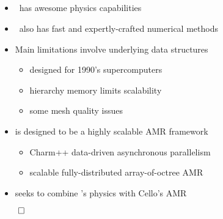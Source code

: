 \NEWSEC

\subsection{\ssIntroSummary}


\begin{frame}[fragile,label=ss-intro-summary] 
\secframetitle{\ssIntroSummary}

\begin{itemize}
\item \enzo\  has awesome physics capabilities
\item \enzo\  also has fast and expertly-crafted numerical methods
\item Main limitations involve underlying data structures
  \begin{itemize}
  \item designed for 1990's supercomputers
  \item hierarchy memory limits scalability
  \item some mesh quality issues
  \end{itemize}
\item {} is designed to be a highly scalable AMR framework
  \begin{itemize}
  \item Charm++ data-driven asynchronous parallelism
  \item scalable fully-distributed array-of-octree AMR
  \end{itemize}
\item {} seeks to combine \enzo's physics with Cello's AMR
\end{itemize}
\vfill
\centerline{$\qed$}
\end{frame}

